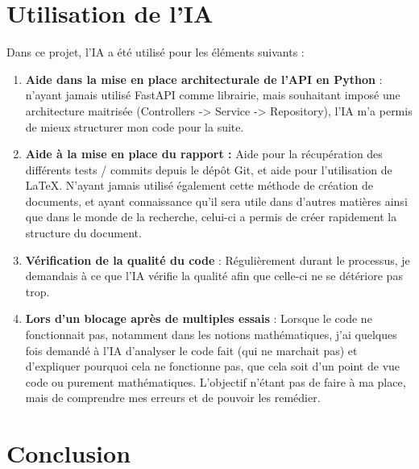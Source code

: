 \documentclass[12pt,a4paper]{article}
\begin{document}
\newpage

\section{Utilisation de l'IA}

Dans ce projet, l'IA a été utilisé pour les éléments suivants :

\begin{enumerate}
	\item \textbf{Aide dans la mise en place architecturale de l'API en Python} : n'ayant jamais utilisé FastAPI comme librairie, mais souhaitant imposé une architecture maitrisée (Controllers -> Service -> Repository), l'IA m'a permis de mieux structurer mon code pour la suite.
	\item \textbf{Aide à la mise en place du rapport :} Aide pour la récupération des différents tests / commits depuis le dépôt Git, et aide pour l'utilisation de LaTeX. N'ayant jamais utilisé également cette méthode de création de documents, et ayant connaissance qu'il sera utile dans d'autres matières ainsi que dans le monde de la recherche, celui-ci a permis de créer rapidement la structure du document.
	\item \textbf{Vérification de la qualité du code} : Régulièrement durant le processus, je demandais à ce que l'IA vérifie la qualité afin que celle-ci ne se détériore pas trop.
	\item \textbf{Lors d'un blocage après de multiples essais} : Lorsque le code ne fonctionnait pas, notamment dans les notions mathématiques, j'ai quelques fois demandé à l'IA d'analyser le code fait (qui ne marchait pas) et d'expliquer pourquoi cela ne fonctionne pas, que cela soit d'un point de vue code ou purement mathématiques. L'objectif n'étant pas de faire à ma place, mais de comprendre mes erreurs et de pouvoir les remédier.

\end{enumerate}

\newpage

\section{Conclusion}
\end{document}
